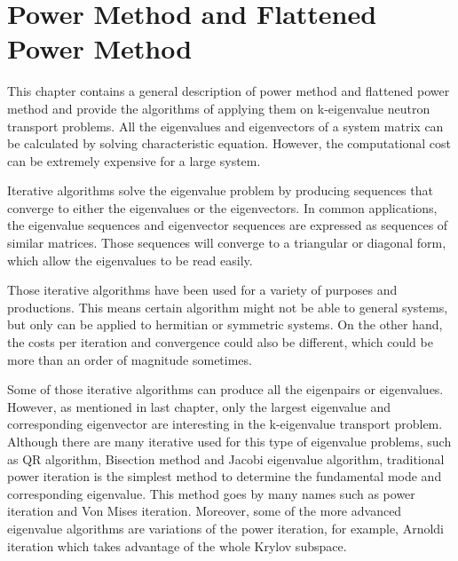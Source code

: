 \cleardoublepage

\chapter{Power Method and Flattened Power Method}
This chapter contains a general description of power method and flattened power method and provide the algorithms of applying them on k-eigenvalue neutron transport problems.
All the eigenvalues and eigenvectors of a system matrix can be calculated by solving characteristic equation. 
However, the computational cost can be extremely expensive for a large system.

Iterative algorithms solve the eigenvalue problem by producing sequences that converge to either the eigenvalues or the eigenvectors.
In common applications, the eigenvalue sequences and eigenvector sequences are expressed as sequences of similar matrices. 
Those sequences will converge to a triangular or diagonal form, which allow the eigenvalues to be read easily. 

Those iterative algorithms have been used for a variety of purposes and productions.
This means certain algorithm might not be able to general systems, but only can be applied to hermitian or symmetric systems.
On the other hand, the costs per iteration and convergence could also be different, which could be more than an order of magnitude sometimes. 

Some of those iterative algorithms can produce all the eigenpairs or eigenvalues. 
However, as mentioned in last chapter, only the largest eigenvalue and corresponding eigenvector are interesting in the k-eigenvalue transport problem.
Although there are many iterative used for this type of eigenvalue problems, such as QR algorithm, Bisection method and Jacobi eigenvalue algorithm, traditional power iteration is the simplest method to determine the fundamental mode and corresponding eigenvalue.
This method goes by many names such as power iteration and Von Mises iteration.
Moreover, some of the more advanced eigenvalue algorithms are variations of the power iteration, for example, Arnoldi iteration which takes advantage of the whole Krylov subspace. 

